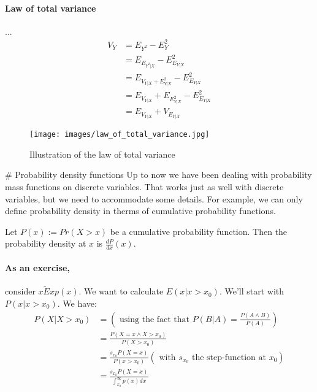 \paragraph{Law of total variance} ...
\begin{equation} \label{lawOfTotalVariance}
    \begin{aligned}
        V_Y &= E_{Y^2} - E_Y^2 \\
            &= E_{E_{Y^2 | X}} - E^2_{E_{Y|X}} \\
            &= E_{  V_{Y|X} + E^2_{Y|X}  } - E^2_{E_{Y|X}} \\
            &= E_{V_{Y|X}} + E_{E^2_{Y|X}} - E^2_{E_{Y|X}} \\
            &= E_{V_{Y|X}} + V_{E_{Y|X}}
    \end{aligned}
\end{equation}


\begin{figure}[h]
    \caption{Illustration of the law of total variance}
    \centering
      \texttt{[image: images/law\_of\_total\_variance.jpg]}
\end{figure}
 
 
# Probability density functions
Up to now we have been dealing with probability mass functions on discrete variables.
That works just as well with discrete variables, but we need to accommodate some details.
For example, we can only define probability density in therms of cumulative probability functions.

Let $P(x) := Pr(X > x)$ be a cumulative probability function.
Then the probability density at $x$ is $\frac{d P}{d x}(x)$.

\paragraph{As an exercise,} consider $x \tilde Exp(x)$. We want to calculate $E(x | x > x_0)$. 
We'll start with $P(x | x > x_0)$.
We have:
\begin{equation}
    \begin{aligned}
        P(X | X > x_0) &= \left( \text{ using the fact that } P(B|A) = \frac{P(A \land B)}{P(A)} \right) \\
                          &= \frac{ P(X = x \land X > x_0) }{ P(X > x_0) } \\
                          &= \frac{ s_{x_0} P(X=x) }{ P(x > x_0) }  (\text{ with $s_{x_0}$ the step-function at $x_0$}) \\
                          &= \frac{ s_{x_0} P(X=x) }{ \int_{x_0}^\infty p(x) dx }
    \end{aligned}
\end{equation}

